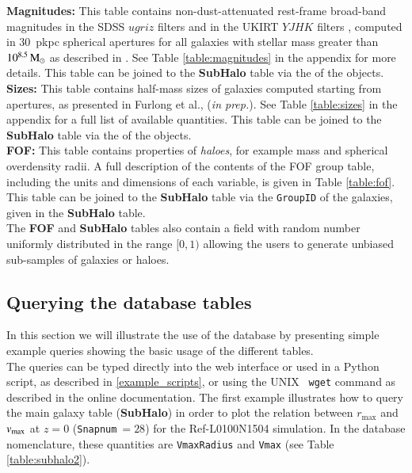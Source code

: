 {\bf Magnitudes:} This table contains non-dust-attenuated rest-frame broad-band
magnitudes in the SDSS $ugriz$ filters \citep{SDSSfilters} and in the UKIRT
$YJHK$ filters \citep{UKIRTfilters}, computed in 30~pkpc spherical apertures for
all galaxies with stellar mass greater than $10^{8.5}\, \mathrm{M}_\odot$ as described in
\cite{Trayford2015}.  See Table \ref{table:magnitudes} in the appendix for more
details. This table can be joined to the {\bf SubHalo} table via the \GalaxyID
of the objects. \\

{\bf Sizes:} This table contains half-mass sizes of galaxies computed starting
from apertures, as presented in Furlong et al., ({\it in prep.}). See Table
\ref{table:sizes} in the appendix for a full list of available quantities. This
table can be joined to the {\bf SubHalo} table via the \GalaxyID of the
objects. \\

{\bf FOF:} This table contains properties of {\em haloes}, for example mass and
spherical overdensity radii. A full description of the contents of the FOF group
table, including the units and dimensions of each variable, is given in Table
\ref{table:fof}. This table can be joined to the {\bf SubHalo} table via the
    {\tt GroupID} of the galaxies, given in the {\bf SubHalo} table. \\


The {\bf FOF} and {\bf SubHalo} tables also contain a field with random number
uniformly distributed in the range $[0,1)$ allowing the users to generate
  unbiased sub-samples of galaxies or haloes.


\subsection{Querying the database tables}
In this section we will illustrate the use of the database by
presenting simple example queries showing the basic usage of the different
\sql tables. \\

The queries can be typed directly into the web interface or used in a {\sc
  Python} script, as described in \ref{example_scripts}, or using the UNIX {\tt
  wget} command as described in the online documentation. The first example
illustrates how to query the main galaxy table ({\bf SubHalo}) in order to plot
the relation between $r_{\max}$ and $v_{\rm max}$ at $z=0$ ({\tt Snapnum}$~=28$)
for the Ref-L0100N1504 simulation. In the database nomenclature, these
quantities are {\tt VmaxRadius} and {\tt Vmax} (see Table \ref{table:subhalo2}).


